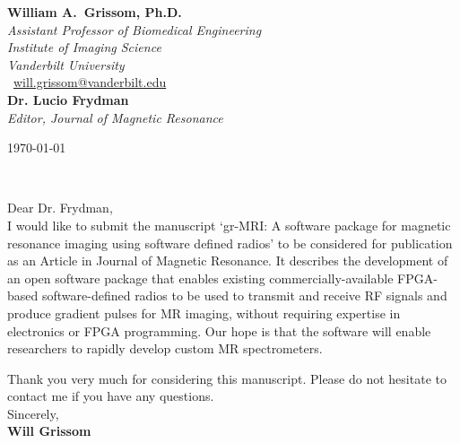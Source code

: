 \documentclass[11pt]{article}
\def\firstname{William A.}
\def\familyname{Grissom, Ph.D.}
\begin{document}
\sffamily   %
\raggedright%
{\bfseries \firstname~\familyname}\\[.35ex]
\small{\itshape%
Assistant Professor of Biomedical Engineering\\
Institute of Imaging Science\\
Vanderbilt University\\}
\Letter~\href{mailto:will.grissom@vanderbilt.edu}{will.grissom@vanderbilt.edu}\\[2em]
{\bfseries Dr. Lucio Frydman}\\[.35ex]
\small{\itshape
Editor, Journal of Magnetic Resonance\\[1em]}
%
\large
\hfill\begin{minipage}[t]{\textwidth} %
\raggedleft %
\today
\end{minipage}\\[2em]
\raggedright
Dear Dr. Frydman,\\[1.5em]
%
I would like to submit the manuscript `gr-MRI: A software package for magnetic resonance imaging using software defined radios' to be considered
for publication as an Article in Journal of Magnetic Resonance. 
It describes the development of an open software package that enables existing commercially-available
FPGA-based software-defined radios to be used to transmit and receive RF signals and produce gradient pulses for MR imaging, 
without requiring expertise in electronics or FPGA programming. 
Our hope is that the software will enable researchers to rapidly develop custom MR spectrometers. 

\par Thank you very much for considering this manuscript. 
Please do not hesitate to contact me if you have any questions.\\[1.5em]
% 
Sincerely,\\[1.5em] %
%
{\bfseries Will Grissom}\\
%
\vfill%
\end{document}
